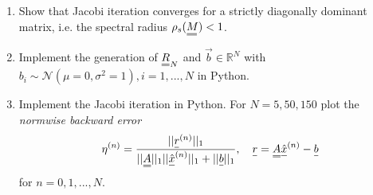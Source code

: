     \begin{enumerate}
        \item Show that Jacobi iteration converges for a strictly diagonally dominant matrix, i.e. 
        the spectral radius $\rho_s(\mat{M}) < 1$.
        \item Implement the generation of $\mat{R}_N$ and $\vec{b}\in\mathbb{R}^N$ with $b_i \sim \mathcal{N}(\mu = 0,\sigma^2 = 1), i = 1,...,N$ in Python.
        \item Implement the Jacobi iteration in Python. For $N = 5, 50, 150$ plot the \textit{normwise backward error}
        \begin{equation}
            \eta^{(n)} = \frac{||\vec{r}^{(n)}||_1}{||\mat{A}||_1 ||\vec{\hat{x}}^{(n)}||_1 + ||\vec{b}||_1}, \quad \vec{r} = \mat{A}\vec{\hat{x}}^{(n)} - \vec{b}
        \end{equation}
        for $n = 0, 1, ..., N$.
    \end{enumerate}


